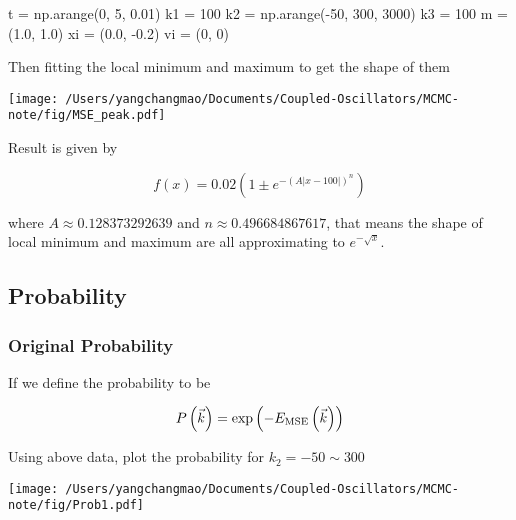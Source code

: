 \documentclass[
]{article}
\newenvironment{Shaded}{}{}
\newcommand{\DecValTok}[1]{\textcolor[rgb]{0.25,0.63,0.44}{#1}}
\newcommand{\FloatTok}[1]{\textcolor[rgb]{0.25,0.63,0.44}{#1}}
\newcommand{\NormalTok}[1]{#1}
\newcommand{\OperatorTok}[1]{\textcolor[rgb]{0.40,0.40,0.40}{#1}}
\begin{document}
\begin{Shaded}
\begin{Highlighting}[]
\NormalTok{t  }\OperatorTok{=}\NormalTok{ np.arange(}\DecValTok{0}\NormalTok{, }\DecValTok{5}\NormalTok{, }\FloatTok{0.01}\NormalTok{)}
\NormalTok{k1 }\OperatorTok{=} \DecValTok{100}
\NormalTok{k2 }\OperatorTok{=}\NormalTok{ np.arange(}\OperatorTok{{-}}\DecValTok{50}\NormalTok{, }\DecValTok{300}\NormalTok{, }\DecValTok{3000}\NormalTok{)}
\NormalTok{k3 }\OperatorTok{=} \DecValTok{100}
\NormalTok{m  }\OperatorTok{=}\NormalTok{ (}\FloatTok{1.0}\NormalTok{, }\FloatTok{1.0}\NormalTok{)}
\NormalTok{xi }\OperatorTok{=}\NormalTok{ (}\FloatTok{0.0}\NormalTok{, }\OperatorTok{{-}}\FloatTok{0.2}\NormalTok{)}
\NormalTok{vi }\OperatorTok{=}\NormalTok{ (}\DecValTok{0}\NormalTok{, }\DecValTok{0}\NormalTok{)}
\end{Highlighting}
\end{Shaded}

Then fitting the local minimum and maximum to get the shape of them

\texttt{[image: /Users/yangchangmao/Documents/Coupled-Oscillators/MCMC-note/fig/MSE\_peak.pdf]}

Result is given by

\[f\left(x\right) = 0.02\left(1\pm e^{-\left(A\left|x-100\right|\right)^{n}}\right)\]

where \(A\approx 0.128373292639\) and \(n\approx 0.496684867617\), that
means the shape of local minimum and maximum are all approximating to
\(e^{-\sqrt{x}}\).

\hypertarget{probability}{%
\subsection{Probability}\label{probability}}

\hypertarget{original-probability}{%
\subsubsection{Original Probability}\label{original-probability}}

If we define the probability to be

\[P\left(\vec{k}\right) = \exp\left(-E_{\rm MSE}\left(\vec{k}\right)\right)\]

Using above data, plot the probability for \(k_2=-50\sim 300\)

\texttt{[image: /Users/yangchangmao/Documents/Coupled-Oscillators/MCMC-note/fig/Prob1.pdf]}
\end{document}
